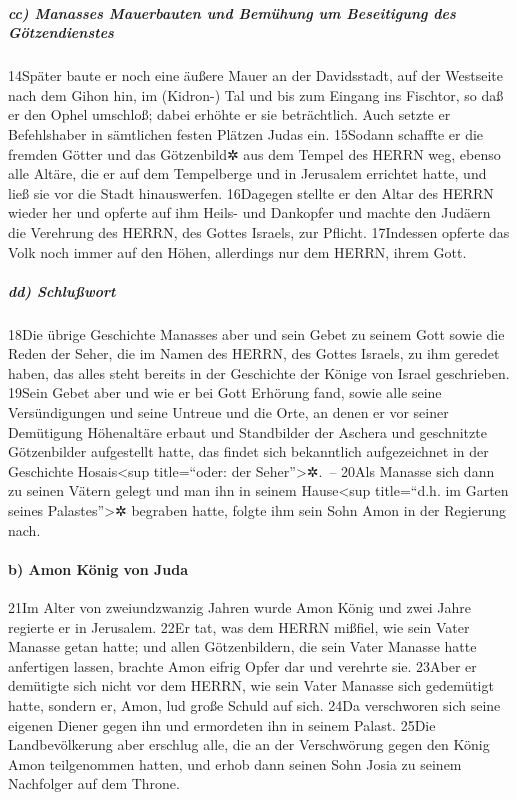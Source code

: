 \hypertarget{cc-manasses-mauerbauten-und-bemuxfchung-um-beseitigung-des-guxf6tzendienstes}{%
\subparagraph{cc) Manasses Mauerbauten und Bemühung um Beseitigung des
Götzendienstes}\label{cc-manasses-mauerbauten-und-bemuxfchung-um-beseitigung-des-guxf6tzendienstes}}

14Später baute er noch eine äußere Mauer an der Davidsstadt, auf der
Westseite nach dem Gihon hin, im (Kidron-) Tal und bis zum Eingang ins
Fischtor, so daß er den Ophel umschloß; dabei erhöhte er sie
beträchtlich. Auch setzte er Befehlshaber in sämtlichen festen Plätzen
Judas ein. 15Sodann schaffte er die fremden Götter und das Götzenbild✲
aus dem Tempel des HERRN weg, ebenso alle Altäre, die er auf dem
Tempelberge und in Jerusalem errichtet hatte, und ließ sie vor die Stadt
hinauswerfen. 16Dagegen stellte er den Altar des HERRN wieder her und
opferte auf ihm Heils- und Dankopfer und machte den Judäern die
Verehrung des HERRN, des Gottes Israels, zur Pflicht. 17Indessen opferte
das Volk noch immer auf den Höhen, allerdings nur dem HERRN, ihrem Gott.

\hypertarget{dd-schluuxdfwort}{%
\subparagraph{dd) Schlußwort}\label{dd-schluuxdfwort}}

18Die übrige Geschichte Manasses aber und sein Gebet zu seinem Gott
sowie die Reden der Seher, die im Namen des HERRN, des Gottes Israels,
zu ihm geredet haben, das alles steht bereits in der Geschichte der
Könige von Israel geschrieben. 19Sein Gebet aber und wie er bei Gott
Erhörung fand, sowie alle seine Versündigungen und seine Untreue und die
Orte, an denen er vor seiner Demütigung Höhenaltäre erbaut und
Standbilder der Aschera und geschnitzte Götzenbilder aufgestellt hatte,
das findet sich bekanntlich aufgezeichnet in der Geschichte
Hosais\textless sup title=``oder: der Seher''\textgreater✲.~-- 20Als
Manasse sich dann zu seinen Vätern gelegt und man ihn in seinem
Hause\textless sup title=``d.h. im Garten seines Palastes''\textgreater✲
begraben hatte, folgte ihm sein Sohn Amon in der Regierung nach.

\hypertarget{b-amon-kuxf6nig-von-juda}{%
\paragraph{b) Amon König von Juda}\label{b-amon-kuxf6nig-von-juda}}

21Im Alter von zweiundzwanzig Jahren wurde Amon König und zwei Jahre
regierte er in Jerusalem. 22Er tat, was dem HERRN mißfiel, wie sein
Vater Manasse getan hatte; und allen Götzenbildern, die sein Vater
Manasse hatte anfertigen lassen, brachte Amon eifrig Opfer dar und
verehrte sie. 23Aber er demütigte sich nicht vor dem HERRN, wie sein
Vater Manasse sich gedemütigt hatte, sondern er, Amon, lud große Schuld
auf sich. 24Da verschworen sich seine eigenen Diener gegen ihn und
ermordeten ihn in seinem Palast. 25Die Landbevölkerung aber erschlug
alle, die an der Verschwörung gegen den König Amon teilgenommen hatten,
und erhob dann seinen Sohn Josia zu seinem Nachfolger auf dem Throne.

